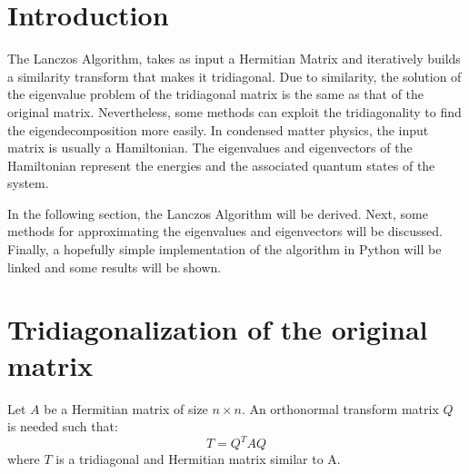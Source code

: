 \label{app:lanczos}

\section{Introduction}

The Lanczos Algorithm, takes as input a Hermitian Matrix and iteratively builds a similarity transform that makes it tridiagonal. Due to similarity, the solution of the eigenvalue problem of the tridiagonal matrix is the same as that of the original matrix. Nevertheless, some methods can exploit the tridiagonality to find the eigendecomposition more easily. In condensed matter physics, the input matrix is usually a Hamiltonian. The eigenvalues and eigenvectors of the Hamiltonian represent the energies and the associated quantum states of the system. 

In the following section, the Lanczos Algorithm will be derived. Next, some methods for approximating the eigenvalues and eigenvectors will be discussed. Finally, a hopefully simple implementation of the algorithm in Python will be linked and some results will be shown.

\section{Tridiagonalization of the original matrix}

Let $A$ be a Hermitian matrix of size $n \times n$. An orthonormal transform matrix $Q$ is needed such that:
%
\begin{equation}
T = Q^{T}AQ 
\end{equation}
%
where $T$ is a tridiagonal and Hermitian matrix similar to A.


